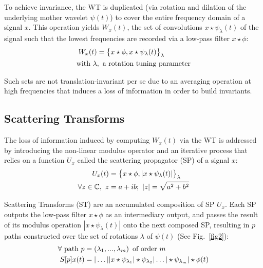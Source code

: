 \documentclass[runningheads]{llncs}
\begin{document}
To achieve invariance, the WT is duplicated (via rotation and dilation of the underlying mother wavelet $\psi(t)$) to cover the entire frequency domain of a signal $x$. This operation yields $W_x(t)$, the set of convolutions $x\star\psi_\lambda(t)$ of the signal such that the lowest frequencies are recorded via a low-pass filter $x\star\phi$\cite{mallatlecture}:
\begin{align}
W_x(t)&=\big\{x\star\phi, x\star\psi_\lambda(t)\big\}_\lambda\\
\text{with }\lambda&,\,\,\text{a rotation tuning parameter}\notag
\end{align}

Such sets are not translation-invariant per se due to an averaging operation at high frequencies that induces a loss of information in order to build invariants.

\subsection{Scattering Transforms}

The loss of information induced by computing $W_x(t)$ via the WT is addressed by introducing the non-linear modulus operator and an iterative process that relies on a function $U_x$ called the scattering propagator (SP)\cite{bruna2012invariant}\cite{mallatlecture} of a signal $x$:
\begin{align}
U_x(t)&=\big\{x\star\phi, |x\star\psi_\lambda(t)|\big\}_\lambda\\
\forall z \in \mathbb{C},\,\, z &= a + ib;\,\,|z|=\sqrt{a^2+b^2}\notag
\end{align}

Scattering Transforms (ST) are an accumulated composition of SP $U_x$. Each SP outputs the low-pass filter $x\star\phi$ as an intermediary output, and passes the result of its modulus operation $|x\star\psi_\lambda(t)|$ onto the next composed SP, resulting in $p$ paths constructed over the set of rotations $\lambda$ of $\psi(t)$ (See Fig.~\ref{fig2}):
\begin{align}
\forall\text{ path }p&=(\lambda_1, ..., \lambda_m)\,\text{ of order $m$}\notag\\
S[p]x(t) &= |\hdots||x\star\psi_{\lambda_1}|\star\psi_{\lambda_2}|\hdots|\star\psi_{\lambda_m}|\star\phi(t)
\end{align}
\end{document}
